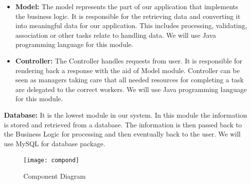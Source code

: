       \begin{itemize}
        \item \textbf{Model:} The model represents the part of our application that implements the business logic. It is responsible for the retrieving data and converting it into meaningful data for our application. This includes processing, validating, association or other tasks relate to handling data. We will use Java programming language for this module.
        \item \textbf{Controller:} The Controller handles requests from user. It is responsible for rendering back a response with the aid of Model module. Controller can be seen as managers taking care that all needed resources for completing a task are delegated to the correct workers. We will use Java programming language for this module.
      \end{itemize}
\qquad\textbf{Database:} It is the lowest module in our system. In this module the information is stored and retrieved from a database. The information is then passed back to the Business Logic for processing and then eventually back to the user. We will use MySQL for database package.

\begin{figure}[tbh]
  \begin{center}
  \texttt{[image: compond]}
    \caption{Component Diagram}\label{Fig 1:}
  \end{center}
\end{figure}

\newpage
